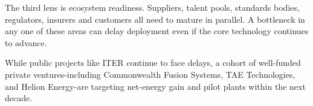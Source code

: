 \documentclass[10pt,a4paper]{article}
\begin{document}
{\small The third lens is ecosystem readiness. Suppliers, talent pools, standards bodies, regulators, insurers and customers all need to mature in parallel. A bottleneck in any one of these areas can delay deployment even if the core technology continues to advance.}\par
{}\par\vspace{1pt}
{\small While public projects like ITER continue to face delays, a cohort of well-funded private ventures-including Commonwealth Fusion Systems, TAE Technologies, and Helion Energy-are targeting net-energy gain and pilot plants within the next decade.}\par
\label{chap:1:end}
\end{document}
